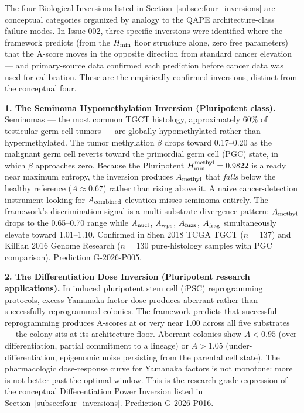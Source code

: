 \documentclass[12pt,a4paper]{article}
\begin{document}
The four Biological Inversions listed in Section~\ref{subsec:four_inversions}
are conceptual categories organized by analogy to the QAPE architecture-class
failure modes. In Issue 002, three specific inversions were identified where
the framework predicts (from the $H_{\rm min}$ floor structure alone, zero free
parameters) that the A-score moves in the opposite direction from standard
cancer elevation --- and primary-source data confirmed each prediction before
cancer data was used for calibration. These are the empirically confirmed
inversions, distinct from the conceptual four.

\textbf{1. The Seminoma Hypomethylation Inversion (Pluripotent class).}
Seminomas --- the most common TGCT histology, approximately 60\% of testicular
germ cell tumors --- are globally hypomethylated rather than hypermethylated.
The tumor methylation $\beta$ drops toward 0.17--0.20 as the malignant germ
cell reverts toward the primordial germ cell (PGC) state, in which $\beta$
approaches zero. Because the Pluripotent $H_{\rm min}^{\rm methyl} = 0.9822$
is already near maximum entropy, the inversion produces $A_{\rm methyl}$ that
\textit{falls} below the healthy reference ($A \approx 0.67$) rather than
rising above it. A naive cancer-detection instrument looking for
$A_{\rm combined}$ elevation misses seminoma entirely. The framework's
discrimination signal is a multi-substrate divergence pattern:
$A_{\rm methyl}$ drops to the 0.65--0.70 range while $A_{\rm nucl}$,
$A_{\rm wps}$, $A_{\rm fuzz}$, $A_{\rm frag}$ simultaneously elevate toward
1.01--1.10. Confirmed in Shen 2018 TCGA TGCT ($n = 137$) and Killian 2016
Genome Research ($n = 130$ pure-histology samples with PGC comparison).
Prediction G-2026-P005.

\textbf{2. The Differentiation Dose Inversion (Pluripotent research
applications).} In induced pluripotent stem cell (iPSC) reprogramming
protocols, excess Yamanaka factor dose produces aberrant rather than
successfully reprogrammed colonies. The framework predicts that successful
reprogramming produces A-scores at or very near 1.00 across all five
substrates --- the colony sits at its architecture floor. Aberrant colonies
show $A < 0.95$ (over-differentiation, partial commitment to a lineage) or
$A > 1.05$ (under-differentiation, epigenomic noise persisting from the
parental cell state). The pharmacologic dose-response curve for Yamanaka
factors is not monotone: more is not better past the optimal window. This
is the research-grade expression of the conceptual Differentiation Power
Inversion listed in Section~\ref{subsec:four_inversions}. Prediction
G-2026-P016.
\end{document}
